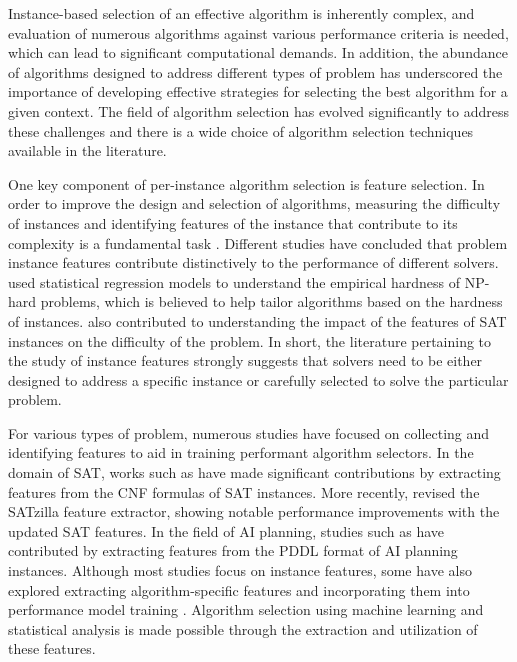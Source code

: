 Instance-based selection of an effective algorithm is inherently complex, and evaluation of numerous algorithms against various performance criteria is needed, which can lead to significant computational demands. In addition, the abundance of algorithms designed to address different types of problem has underscored the importance of developing effective strategies for selecting the best algorithm for a given context. The field of algorithm selection has evolved significantly to address these challenges and there is a wide choice of algorithm selection techniques available in the literature. 

One key component of per-instance algorithm selection is feature selection. In order to improve the design and selection of algorithms, measuring the difficulty of instances and identifying features of the instance that contribute to its complexity is a fundamental task \cite{SMITHMILES2012875,10.1007/978-3-319-32034-2_25}. Different studies have concluded that problem instance features contribute distinctively to the performance of different solvers. \cite{10.1007/3-540-46135-3_37} used statistical regression models to understand the empirical hardness of NP-hard problems, which is believed to help tailor algorithms based on the hardness of instances. \cite{10.1007/978-3-540-30201-8_33} also contributed to understanding the impact of the features of SAT instances on the difficulty of the problem. In short, the literature pertaining to the study of instance features strongly suggests that solvers need to be either designed to address a specific instance or carefully selected to solve the particular problem. 

For various types of problem, numerous studies have focused on collecting and identifying features to aid in training performant algorithm selectors. In the domain of SAT, works such as \cite{10.1007/978-3-540-30201-8_33, satzilla, HUTTER201479} have made significant contributions by extracting features from the CNF formulas of SAT instances. More recently, \cite{shavit_et_al} revised the SATzilla feature extractor, showing notable performance improvements with the updated SAT features. In the field of AI planning, studies such as \cite{howe2000exploiting,Fawcett_Vallati_Hutter_Hoffmann_Hoos_Leyton-Brown_2014,roberts2008makes,cenamor2013learning} have contributed by extracting features from the PDDL format of AI planning instances. Although most studies focus on instance features, some have also explored extracting algorithm-specific features and incorporating them into performance model training \cite{pmlr-v188-pulatov22a}. Algorithm selection using machine learning and statistical analysis is made possible through the extraction and utilization of these features.

